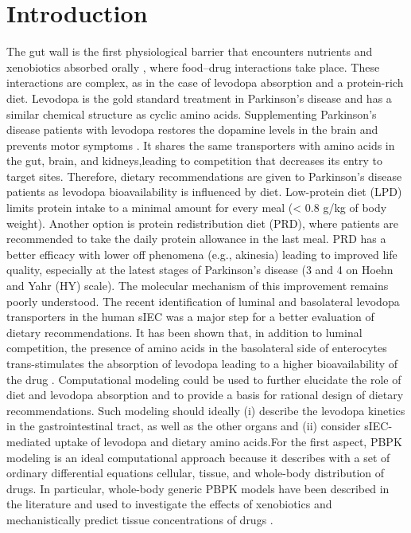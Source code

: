 \section{Introduction}
The gut wall is the first physiological barrier that encounters nutrients and xenobiotics absorbed orally \cite{lennernas1998human}, where food–drug interactions take place. These interactions are complex, as in the case of levodopa absorption and a protein-rich diet. Levodopa is the gold standard treatment in Parkinson’s disease \cite{brooks2008optimizing} and has a similar chemical structure as cyclic amino acids\cite{eisenhofer1997substantial}. Supplementing Parkinson's disease patients with levodopa restores the dopamine levels in the brain and prevents motor symptoms \cite{fahn2015levodopa}. 
It shares the same transporters with amino acids in the gut, brain, and kidneys,leading to competition that decreases its entry to target sites\cite{nutt1984off}. Therefore, dietary recommendations are given to Parkinson's disease patients \cite{ishihara2005systematic} as levodopa bioavailability is influenced by diet\cite{contin2010pharmacokinetics}. Low-protein diet (LPD) limits protein intake to a minimal amount for every meal (< 0.8 g/kg of body weight). Another option is protein redistribution diet (PRD), where patients are recommended to take the daily protein allowance in the last meal. PRD has a better efficacy with lower off phenomena (e.g., akinesia) leading to improved life quality, especially at the latest stages of Parkinson's disease (3 and 4 on Hoehn and Yahr (HY) scale)\cite{cereda2010low}. The molecular mechanism of this improvement remains poorly understood. The recent identification of luminal and basolateral levodopa transporters in the human sIEC was a major step for a better evaluation of dietary recommendations. It has been shown that, in addition to luminal competition, the presence of amino acids in the basolateral side of enterocytes trans-stimulates the absorption of levodopa leading to a higher bioavailability of the drug \cite{camargo2014molecular}. Computational modeling could be used to further elucidate the role of diet and levodopa absorption and to provide a basis for rational design of dietary recommendations. Such modeling should ideally (i) describe the levodopa kinetics in the gastrointestinal tract, as well as the other organs and (ii) consider sIEC-mediated uptake of levodopa and dietary amino acids.For the first aspect, PBPK modeling is an ideal computational approach because it describes with a set of ordinary differential equations cellular, tissue, and whole-body distribution of drugs. In particular, whole-body generic PBPK models have been described in the literature and used to investigate the effects of xenobiotics and mechanistically predict tissue concentrations of drugs \cite{jones2013basic}.
